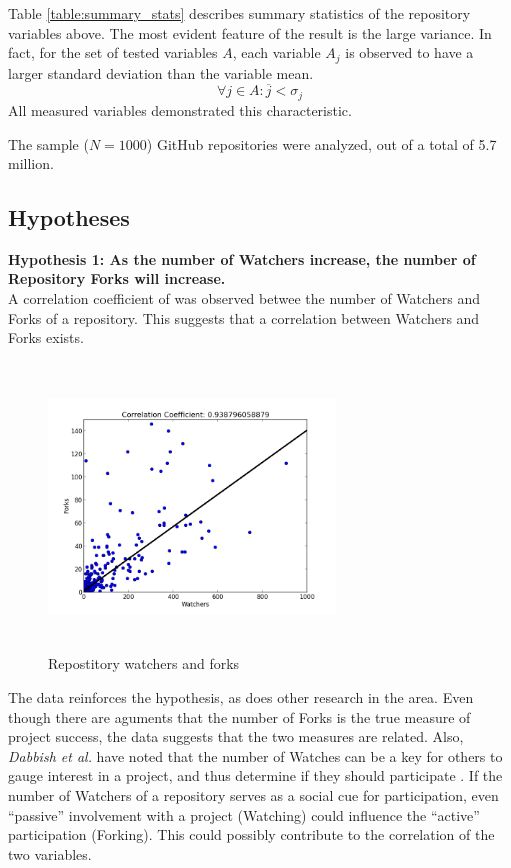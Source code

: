 \documentclass{proc}
\begin{document}
Table \ref{table:summary_stats} describes summary statistics of the repository variables above. The most evident feature of the result is the large variance. In fact, for the set of tested variables $A$, each variable $A_j$ is observed to have a larger standard deviation than the variable mean.
\begin{equation}
\forall j \in A \colon \overline{j} < \sigma_{j}
\label{eq:variance}
\end{equation}
All measured variables demonstrated this characteristic.

The sample ($N = 1000$) GitHub repositories were analyzed, out of a total of 5.7 million\cite{githubPress}.

\subsection{Hypotheses}
\textbf{Hypothesis 1: As the number of Watchers increase, the number of Repository Forks will increase.}\\
A correlation coefficient of  was observed betwee the number of Watchers and Forks of a repository. This suggests that a correlation between Watchers and Forks exists.
\begin{figure}
\includegraphics[height=3in,width=3in]{images/watcher_forks_scatterplot.png}
\caption{Repostitory watchers and forks}
\end{figure}
The data reinforces the hypothesis, as does other research in the area. Even though there are aguments that the number of Forks is the true measure of project success\cite{baudry2012towards}, the data suggests that the two measures are related. Also, \textit{Dabbish et al.} have noted that the number of Watches can be a key for others to gauge interest in a project, and thus determine if they should participate \cite{dabbish2013leveraging}. If the number of Watchers of a repository serves as a social cue for participation, even ``passive'' involvement with a project (Watching) could influence the ``active'' participation (Forking). This could possibly contribute to the correlation of the two variables.\\
\end{document}
